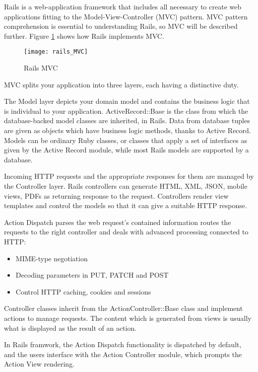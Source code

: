 Rails is a web-application framework that includes all necessary to create web applications fitting to the Model-View-Controller (MVC) pattern.
MVC pattern comprehension is essential to understanding Rails, so MVC will be described further. 
Figure \ref{rails_mvc} shows how Rails implements MVC. 

\begin{figure}[!ht]
\centering
\texttt{[image: rails\_MVC]}
\caption{Rails MVC}\label{rails_mvc}
\end{figure}

MVC splits your application into three layers, each having a distinctive duty.

The Model layer depicts your domain model and contains the business logic that is individual to your application. ActiveRecord::Base is the class from which the database-backed model classes are inherited, in Rails. Data from database tuples are given as objects which have business logic methods, thanks to Active Record. Models can be ordinary Ruby classes, or classes that apply a set of interfaces as given by the Active Record module, while most Rails models are supported by a database.

Incoming HTTP requests and the appropriate responses for them are managed by the Controller layer.
Rails controllers can generate HTML, XML, JSON, mobile views, PDFs as returning response to the request. Controllers render view templates and control the models so that it can give a suitable HTTP response. 

Action Dispatch parses the web request's contained information routes the requests to the right controller and deals with advanced processing connected to HTTP:
\begin{itemize}
  \item MIME-type negotiation
  \item Decoding parameters in PUT, PATCH and POST
  \item Control HTTP caching, cookies and sessions
\end{itemize}

Controller classes inherit from the ActionController::Base class and implement actions to manage requests. The content which is generated from views is usually what is displayed as the result of an action. 

In Rails framwork, the Action Dispatch functionality is dispatched by default, and the users interface with the Action Controller module, which prompts the Action View rendering. 

